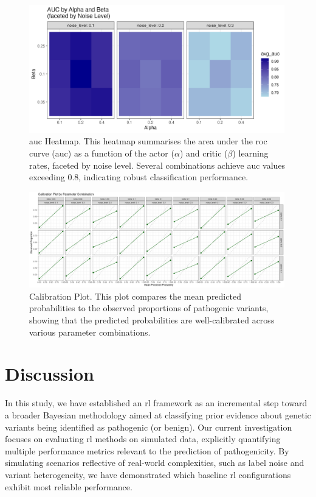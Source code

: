 \begin{figure}[h]
    \centering
    \includegraphics[width=0.99\textwidth]{../figures/auc.png}
    \caption{\ac{auc} Heatmap. This heatmap summarises the area under the \ac{roc} curve  (\ac{auc}) as a function of the actor ($\alpha$) and critic ($\beta$) learning rates, faceted by noise level. Several combinations achieve \ac{auc} values exceeding 0.8, indicating robust classification performance.}
    \label{fig:auc}
\end{figure}

\begin{figure}[h]
    \centering
    \includegraphics[width=0.99\textwidth]{../figures/calibration.png}
    \caption{Calibration Plot. This plot compares the mean predicted probabilities to the observed proportions of pathogenic variants, showing that the predicted probabilities are well-calibrated across various parameter combinations.}
    \label{fig:calibration}
\end{figure}

\clearpage

\section{Discussion}

In this study, we have established an \ac{rl} framework as an incremental step toward a broader Bayesian methodology aimed at classifying prior evidence about genetic variants being identified as pathogenic (or benign). Our current investigation focuses on evaluating \ac{rl} methods on simulated data, explicitly quantifying multiple performance metrics relevant to the prediction of pathogenicity. By simulating scenarios reflective of real-world complexities, such as label noise and variant heterogeneity, we have demonstrated which baseline \ac{rl} configurations exhibit most reliable performance.

